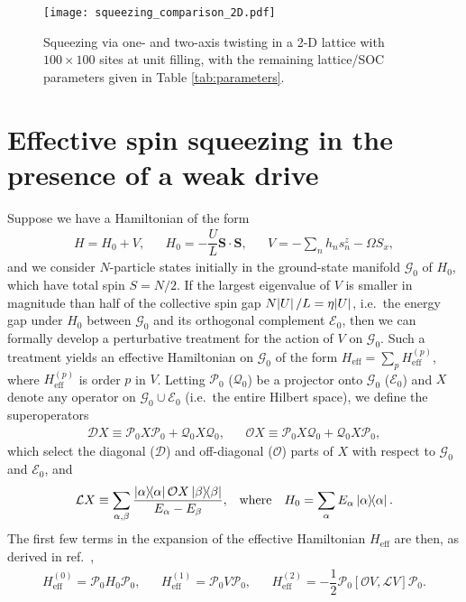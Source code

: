 \documentclass[aps,notitlepage,nofootinbib,11pt]{revtex4-1}
\renewcommand{\t}{\text} %
\newcommand{\f}[2]{\dfrac{#1}{#2}} %
\renewcommand{\sp}[1]{\left[#1\right]} %
\renewcommand{\v}{\bm} %
\renewcommand{\c}{\cdot} %
\newcommand{\D}{\mathcal{D}}
\newcommand{\E}{\mathcal{E}}
\newcommand{\G}{\mathcal{G}}
\renewcommand{\L}{\mathcal{L}}
\renewcommand{\O}{\mathcal{O}}
\renewcommand{\P}{\mathcal{P}}
\newcommand{\Q}{\mathcal{Q}}
\newcommand{\1}{\mathds{1}}
\begin{document}
\begin{figure}
  \centering
  \texttt{[image: squeezing\_comparison\_2D.pdf]}
  \caption{Squeezing via one- and two-axis twisting in a 2-D lattice
    with $100\times100$ sites at unit filling, with the remaining
    lattice/SOC parameters given in Table \ref{tab:parameters}.}
  \label{fig:squeezing_comparison_2D}
\end{figure}


\newpage
\appendix

\section{Effective spin squeezing in the presence of a weak drive}
\label{sec:squeezing_derivation}

Suppose we have a Hamiltonian of the form
\begin{align}
  H = H_0 + V,
  &&
  H_0 = - \f{U}{L} \v S\c\v S,
  &&
  V = - \sum_n h_n s_n^z - \Omega S_x,
\end{align}
and we consider $N$-particle states initially in the ground-state
manifold $\G_0$ of $H_0$, which have total spin $S=N/2$.  If the
largest eigenvalue of $V$ is smaller in magnitude than half of the
collective spin gap $N\abs{U}/L=\eta\abs{U}$, i.e.~the energy gap
under $H_0$ between $\G_0$ and its orthogonal complement $\E_0$, then
we can formally develop a perturbative treatment for the action of $V$
on $\G_0$.  Such a treatment yields an effective Hamiltonian on $\G_0$
of the form $H_{\t{eff}}=\sum_pH_{\t{eff}}^{(p)}$, where
$H_{\t{eff}}^{(p)}$ is order $p$ in $V$.  Letting $\P_0$ ($\Q_0$) be a
projector onto $\G_0$ ($\E_0$) and $X$ denote any operator on
$\G_0\cup\E_0$ (i.e.~the entire Hilbert space), we define the
superoperators
\begin{align}
  \D X \equiv \P_0 X \P_0 + \Q_0 X \Q_0,
  &&
  \O X \equiv \P_0 X \Q_0 + \Q_0 X \P_0,
\end{align}
which select the diagonal ($\D$) and off-diagonal ($\O$) parts of $X$
with respect to $\G_0$ and $\E_0$, and
\begin{align}
  \L X \equiv \sum_{\alpha,\beta}
  \f{\op{\alpha}\O X\op{\beta}}{E_\alpha-E_\beta},
  &&
  \t{where}
  &&
  H_0 = \sum_\alpha E_\alpha \op\alpha.
\end{align}
The first few terms in the expansion of the effective Hamiltonian
$H_{\t{eff}}$ are then, as derived in
ref.~\cite{bravyi2011schrieffer},
\begin{align}
  H_{\t{eff}}^{(0)} = \P_0 H_0 \P_0,
  &&
  H_{\t{eff}}^{(1)} = \P_0 V \P_0,
  &&
  H_{\t{eff}}^{(2)} = -\f12 \P_0 \sp{\O V,\L V} \P_0.
  \label{eq:H_eff_012}
\end{align}
\end{document}
